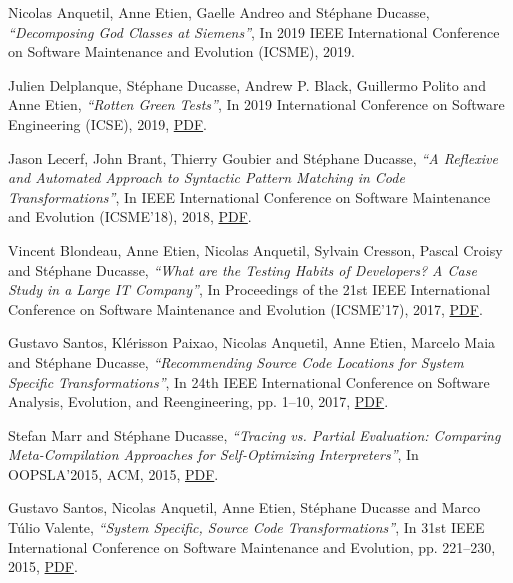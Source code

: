 \documentclass{article}
\newcommand{\czauthors}[1]{#1}
\newcommand{\cztitle}[1]{\emph{``#1''}}
\newcommand{\czbooktitle}[1]{#1}
\begin{document}
\begin{itemize}

	\pub  \czauthors{Nicolas Anquetil, Anne Etien, Gaelle Andreo and St\'ephane Ducasse},  \cztitle{{Decomposing God Classes at Siemens}},  In \czbooktitle{2019 IEEE International Conference on Software Maintenance and Evolution (ICSME)}, 2019.

	\pub  \czauthors{Julien Delplanque, St\'ephane Ducasse, Andrew P. Black, Guillermo Polito and Anne Etien},  \cztitle{Rotten Green Tests},  In \czbooktitle{2019 International Conference on Software Engineering (ICSE)}, 2019, \href{http://rmod-files.lille.inria.fr/Team/Texts/Papers/Delp19a-RottenGreenTests-ICSE2019-v2.pdf}{PDF}.

	\pub  \czauthors{Jason Lecerf, John Brant, Thierry Goubier and St\'ephane Ducasse},  \cztitle{A Reflexive and Automated Approach to Syntactic Pattern Matching in Code Transformations},  In \czbooktitle{IEEE International Conference on Software Maintenance and Evolution (ICSME'18)}, 2018, \href{http://rmod-files.lille.inria.fr/Team/Texts/Papers/Lece18a-ICSME-ReflectiveParsing.pdf}{PDF}.

	\pub  \czauthors{Vincent Blondeau, Anne Etien, Nicolas Anquetil, Sylvain Cresson, Pascal Croisy and St\'ephane Ducasse},  \cztitle{{What are the Testing Habits of Developers? A Case Study in a Large IT Company}},  In \czbooktitle{Proceedings of the 21st IEEE International Conference on Software Maintenance and Evolution (ICSME'17)}, 2017, \href{http://rmod-files.lille.inria.fr/Team/Texts/Papers/Blon17a-ICSME-FinalVersion.pdf}{PDF}.

	\pub  \czauthors{Gustavo Santos, Kl\'erisson Paixao, Nicolas Anquetil, Anne Etien, Marcelo Maia and St\'ephane Ducasse},  \cztitle{Recommending Source Code Locations for System Specific Transformations},  In \czbooktitle{24th IEEE International Conference on Software Analysis, Evolution, and Reengineering}, pp. 1--10, 2017, \href{http://rmod-files.lille.inria.fr/Team/Texts/Papers/Sant17a-saner-2017.pdf}{PDF}.

	\pub  \czauthors{Stefan Marr and St\'ephane Ducasse},  \cztitle{Tracing vs. Partial Evaluation: Comparing Meta-Compilation Approaches for Self-Optimizing Interpreters},  In \czbooktitle{OOPSLA'2015}, ACM, 2015, \href{http://rmod-files.lille.inria.fr/Team/Texts/Papers/Marr15b-Official-Oopsla15-TracingVSPartial.pdf}{PDF}.

	\pub  \czauthors{Gustavo Santos, Nicolas Anquetil, Anne Etien, St\'ephane Ducasse and Marco T\'ulio Valente},  \cztitle{System Specific, Source Code Transformations},  In \czbooktitle{31st IEEE International Conference on Software Maintenance and Evolution}, pp. 221--230, 2015, \href{http://rmod-files.lille.inria.fr/Team/Texts/Papers/Sant15a-ICSME-TransformationPatterns.pdf}{PDF}.


\end{itemize}
\end{document}
